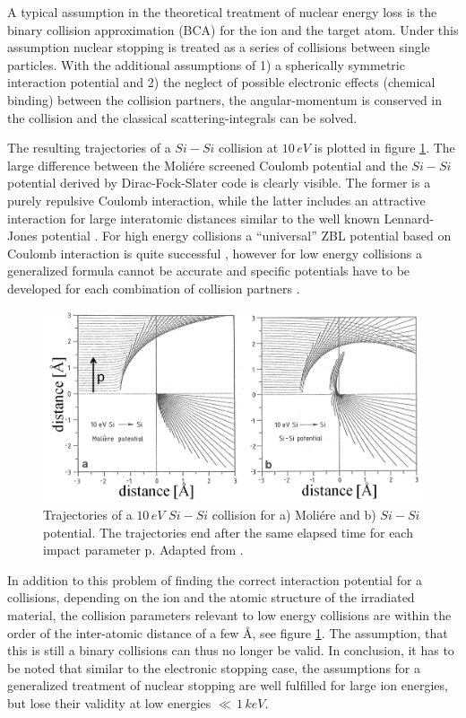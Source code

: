 A typical assumption in the theoretical treatment of nuclear energy loss is the binary collision approximation (BCA) for the ion and the target atom. Under this assumption nuclear stopping is treated as a series of collisions between single particles. With the additional assumptions of 1) a spherically symmetric interaction potential and 2) the neglect of possible electronic effects (chemical binding) between the collision partners, the angular-momentum is conserved in the collision and the classical scattering-integrals can be solved. 

The resulting trajectories of a $Si-Si$ collision at $10\,eV$ is plotted in figure \ref{SiSi}. The large difference between the Moliére screened Coulomb potential and the $Si-Si$ potential derived by Dirac-Fock-Slater code is clearly visible. The former is a purely repulsive Coulomb interaction, while the latter includes an attractive interaction for large interatomic distances similar to the well known Lennard-Jones potential \cite{eckstein_computer_1991}. For high energy collisions a ``universal'' ZBL potential based on Coulomb interaction is quite successful \cite{ziegler_stopping_1985}, however for low energy collisions a generalized formula cannot be accurate and specific potentials have to be developed for each combination of collision partners \cite{dedkov_interatomic_1995,nordlund_repulsive_1997,albe_modeling_2002,nordlund_interatomic_2008}.

\begin{figure}
	\centering
		\includegraphics[width=.6\textwidth]{images/SiSicollision.png}
	\caption{Trajectories of a $10\,eV$ $Si-Si$ collision for a) Moliére and b) $Si-Si$ potential. The trajectories end after the same elapsed time for each impact parameter p. Adapted from \cite{eckstein_computer_1991}.}
	\label{SiSi}
\end{figure} 

In addition to this problem of finding the correct interaction potential for a collisions, depending on the ion and the atomic structure of the irradiated material, the collision parameters relevant to low energy collisions are within the order of the inter-atomic distance of a few \AA, see figure \ref{SiSi}. The assumption, that this is still a binary collisions can thus no longer be valid. In conclusion, it has to be noted that similar to the electronic stopping case, the assumptions for a generalized treatment of nuclear stopping are well fulfilled for large ion energies, but lose their validity at low energies $\ll\,1\,keV$.


